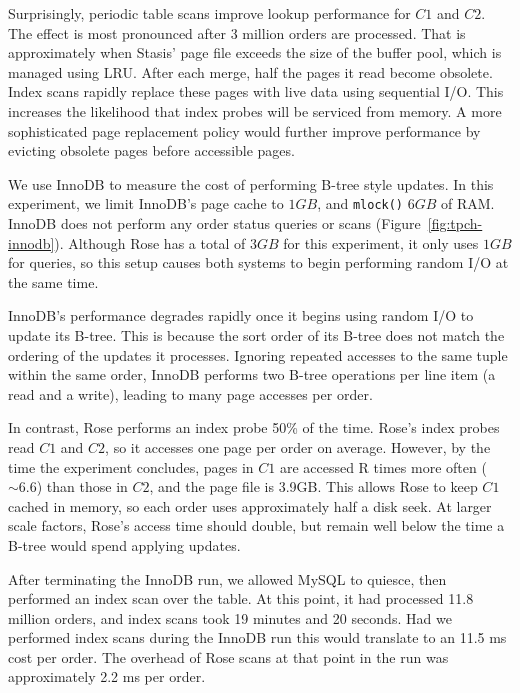 \documentclass{vldb}
\newcommand{\rows}{Rose\xspace}
\newcommand{\rowss}{Rose's\xspace}
\begin{document}
Surprisingly, periodic table scans improve lookup
performance for $C1$ and $C2$.  The effect is most pronounced after
3 million orders are processed.  That is approximately
when Stasis' page file exceeds the size of the buffer pool, which is
managed using LRU.  After each merge, half the pages it read
become obsolete.  Index scans rapidly replace these pages with live
data using sequential I/O.  This increases the likelihood that index
probes will be serviced from memory.  A more sophisticated page
replacement policy would further improve performance by evicting
obsolete pages before accessible pages.

We use InnoDB to measure the cost of performing B-tree style updates.
In this experiment, we limit InnoDB's page cache to $1GB$, and {\tt mlock()} $6GB$
of RAM.  InnoDB does not perform any order status queries or scans (Figure~\ref{fig:tpch-innodb}).
Although \rows has a total of $3GB$ for this
experiment, it only uses $1GB$ for queries, so this setup causes both
systems to begin performing random I/O at the same time.

InnoDB's performance degrades rapidly once it begins using random I/O
to update its B-tree.  This is because the sort order of its B-tree
does not match the ordering of the updates it processes.  Ignoring
repeated accesses to the same tuple within the same order, InnoDB
performs two B-tree operations per line item (a read and a write),
leading to many page accesses per order.

In contrast, \rows performs an index probe 50\% of the time.  \rowss
index probes read $C1$ and $C2$, so it accesses one page per order on
average.  However, by the time the experiment concludes, pages in $C1$
are accessed R times more often ($\sim6.6$) than those in $C2$, and
the page file is 3.9GB.  This allows \rows to keep $C1$ cached in
memory, so each order uses approximately half a disk seek.  At larger
scale factors, \rowss access time should double, but remain well
below the time a B-tree would spend applying updates.

After terminating the InnoDB run, we allowed MySQL to quiesce, then
performed an index scan over the table.  At this point, it had
processed 11.8 million orders, and index scans took 19 minutes and 20
seconds.  Had we performed index scans during the InnoDB run this
would translate to an 11.5 ms cost per order. The overhead of \rows
scans at that point in the run was approximately 2.2 ms per order.
\end{document}
